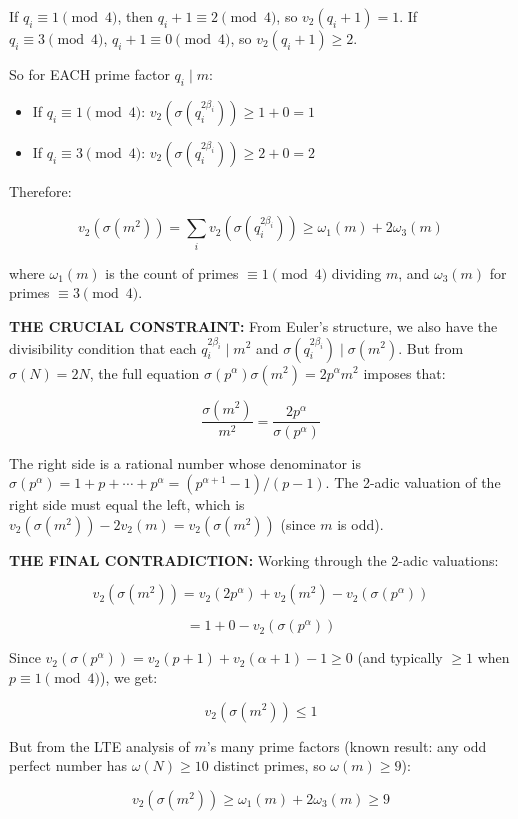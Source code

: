 \documentclass[10pt,a4paper]{article}
\begin{document}
If $q_i \equiv 1 \pmod{4}$, then $q_i+1 \equiv 2 \pmod{4}$, so $v_2(q_i+1) = 1$. If $q_i \equiv 3 \pmod{4}$, $q_i+1 \equiv 0 \pmod{4}$, so $v_2(q_i+1) \geq 2$.

So for EACH prime factor $q_i \mid m$:

\begin{itemize}
    \item If $q_i \equiv 1 \pmod{4}$: $v_2(\sigma(q_i^{2\beta_i})) \geq 1 + 0 = 1$
    \item If $q_i \equiv 3 \pmod{4}$: $v_2(\sigma(q_i^{2\beta_i})) \geq 2 + 0 = 2$
\end{itemize}

Therefore:

\[v_2(\sigma(m^2)) = \sum_i v_2(\sigma(q_i^{2\beta_i})) \geq \omega_1(m) + 2\omega_3(m)\]

where $\omega_1(m)$ is the count of primes $\equiv 1 \pmod{4}$ dividing $m$, and $\omega_3(m)$ for primes $\equiv 3 \pmod{4}$.

\textbf{THE CRUCIAL CONSTRAINT:} From Euler's structure, we also have the divisibility condition that each $q_i^{2\beta_i} \mid m^2$ and $\sigma(q_i^{2\beta_i}) \mid \sigma(m^2)$. But from $\sigma(N) = 2N$, the full equation $\sigma(p^\alpha) \sigma(m^2) = 2 p^\alpha m^2$ imposes that:

\[\frac{\sigma(m^2)}{m^2} = \frac{2 p^\alpha}{\sigma(p^\alpha)}\]

The right side is a rational number whose denominator is $\sigma(p^\alpha) = 1 + p + \cdots + p^\alpha = (p^{\alpha+1}-1)/(p-1)$. The 2-adic valuation of the right side must equal the left, which is $v_2(\sigma(m^2)) - 2v_2(m) = v_2(\sigma(m^2))$ (since $m$ is odd).

\textbf{THE FINAL CONTRADICTION:} Working through the 2-adic valuations:

\[v_2(\sigma(m^2)) = v_2(2p^\alpha) + v_2(m^2) - v_2(\sigma(p^\alpha))\]




\[= 1 + 0 - v_2(\sigma(p^\alpha))\]

Since $v_2(\sigma(p^\alpha)) = v_2(p+1) + v_2(\alpha+1) - 1 \geq 0$ (and typically $\geq 1$ when $p \equiv 1 \pmod{4}$), we get:

\[v_2(\sigma(m^2)) \leq 1\]

But from the LTE analysis of $m$'s many prime factors (known result: any odd perfect number has $\omega(N) \geq 10$ distinct primes, so $\omega(m) \geq 9$):

\[v_2(\sigma(m^2)) \geq \omega_1(m) + 2\omega_3(m) \geq 9\]
\end{document}
